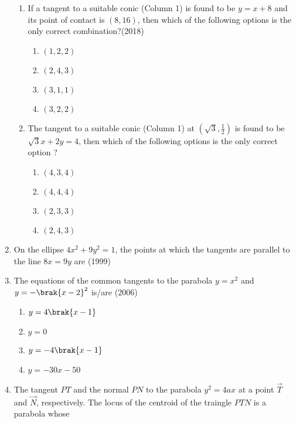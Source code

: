 \begin{enumerate}
\begin{enumerate}
\item If a tangent to a suitable conic (Column 1) is found to be $y = x + 8$ and its point of contact is $(8, 16)$, then which of the following
options is the only correct combination?\hfill {(2018)}
%
\begin{multicols}{4}
\begin{enumerate}
    \item $(1,2,2)$
    \item $(2,4,3)$
    \item $(3,1,1)$
    \item $(3,2,2)$
\end{enumerate}
\end{multicols}
%
\item  The tangent to a suitable conic (Column 1) at $(\sqrt{3},\frac{1}{2})$ is found to be $\sqrt{3}x + 2y = 4$, then which of the following options is the only correct option ? 
%
\begin{multicols}{4}
\begin{enumerate}
    \item $(4,3,4)$
    \item $(4,4,4)$
    \item $(2,3,3)$
    \item $(2,4,3)$
\end{enumerate}
\end{multicols}
\end{enumerate}
\item On the ellipse $4x^2+9y^2=1$, the points at which the tangents are parallel to the line $8x=9y$ are \hfill(1999)
	\begin{multicols}{2}
\begin{enumerate}
	\end{enumerate}
\end{multicols}
%
\item The equations of the common tangents to the parabola $y=x^2$ and $y=-\brak{x-2}^2$ is/are \hfill(2006)\\
	\begin{multicols}{4}
\begin{enumerate}
		\item $y=4\brak{x-1}$
		\item $y=0$
		\item $y=-4\brak{x-1}$
		\item $y=-30x-50$
	\end{enumerate}
\end{multicols}
	\item The tangent ${PT}$ and the normal ${PN}$ to the parabola $y^2=4ax$ at a point $\vec{T}$ and $\vec{N}$, respectively. The locus of the centroid of the traingle ${PTN}$ is a parabola whose


\end{enumerate}
